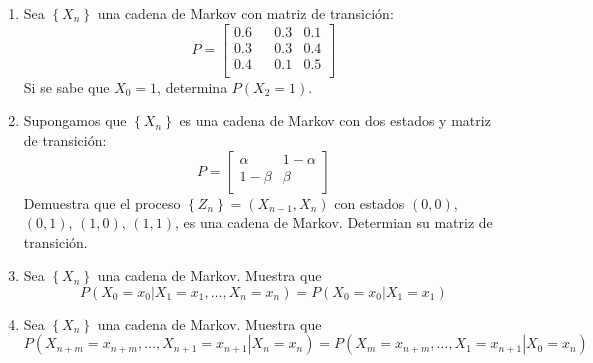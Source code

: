 \documentclass{report}
\begin{document}
\begin{enumerate}
\item Sea $\left\{X_n\right\}$ una cadena de Markov con matriz de transición:
$$P= \left[
    \begin{matrix}
        0.6 & & 0.3 & 0.1 \\
        0.3 & & 0.3 & 0.4 \\
        0.4 & & 0.1 & 0.5 \\
    \end{matrix}
    \right]
$$
Si se sabe que $X_0=1$, determina $P(X_2 = 1)$.
\item Supongamos que $\left\{X_n\right\}$ es una cadena de Markov con dos estados y matriz de transición:
$$P= \left[
    \begin{matrix}
        \alpha & 1-\alpha \\
        1-\beta & \beta \\
    \end{matrix}
    \right]
$$
Demuestra que el proceso $\left\{Z_n\right\}= (X_{n-1}, X_n)$ con estados $(0,0)$, $(0,1)$, $(1,0)$, $(1,1)$, es una cadena de Markov. Determian su matriz de transición.
\item Sea $\left\{X_n\right\}$ una cadena de Markov. Muestra que
$$
P\left(\left.X_0=x_0\right\vert X_1 = x_1, \ldots, X_n = x_n\right) = P\left(\left. X_0=x_0 \right\vert X_1 = x_1\right)
$$
\item Sea $\left\{X_n\right\}$ una cadena de Markov. Muestra que
$$
P\left(\left.X_{n+m}=x_{n+m}, \ldots, X_{n+1} = x_{n+1}\right\vert X_n = x_n\right) = P\left(\left.X_{m}=x_{n+m}, \ldots, X_{1} = x_{n+1}\right\vert X_0 = x_n\right)
$$
\end{enumerate}
\end{document}
